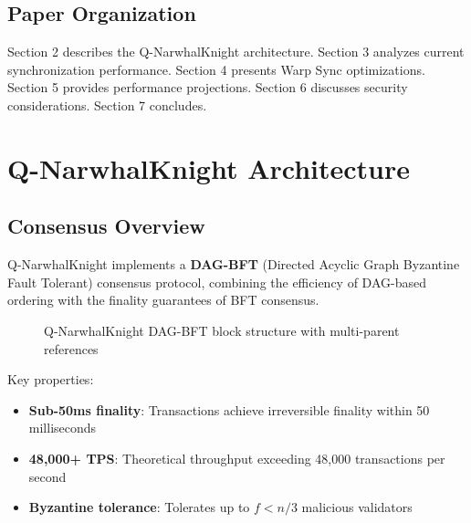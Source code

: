 \documentclass[11pt,a4paper]{article}
\begin{document}
\subsection{Paper Organization}

Section 2 describes the Q-NarwhalKnight architecture. Section 3 analyzes current synchronization performance. Section 4 presents Warp Sync optimizations. Section 5 provides performance projections. Section 6 discusses security considerations. Section 7 concludes.

\section{Q-NarwhalKnight Architecture}

\subsection{Consensus Overview}

Q-NarwhalKnight implements a \textbf{DAG-BFT} (Directed Acyclic Graph Byzantine Fault Tolerant) consensus protocol, combining the efficiency of DAG-based ordering with the finality guarantees of BFT consensus.

\begin{figure}[h]
\centering
{}
\caption{Q-NarwhalKnight DAG-BFT block structure with multi-parent references}
\end{figure}

Key properties:
\begin{itemize}
    \item \textbf{Sub-50ms finality}: Transactions achieve irreversible finality within 50 milliseconds
    \item \textbf{48,000+ TPS}: Theoretical throughput exceeding 48,000 transactions per second
    \item \textbf{Byzantine tolerance}: Tolerates up to $f < n/3$ malicious validators
\end{itemize}
\end{document}
